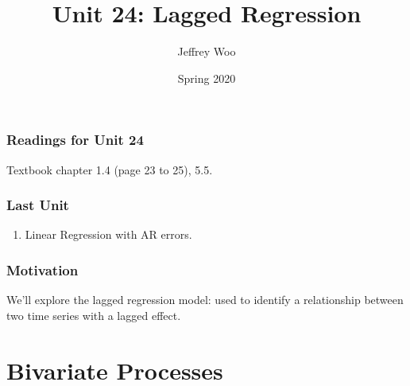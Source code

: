 \documentclass[%
xcolor=pdftex]{beamer}
\title{Unit 24: Lagged Regression}
\author[STAT 5170: Applied Time Series, Unit 26]{Jeffrey Woo}
\institute{Department of Statistics, University of Virginia}
\date{Spring 2020}
\begin{document}
\frame{\titlepage}


\begin{frame}
\frametitle{Readings for Unit 24}

Textbook chapter 1.4 (page 23 to 25), 5.5.

\end{frame}


\begin{frame}
\frametitle{Last Unit}
\begin{enumerate}
\item Linear Regression with AR errors.
\end{enumerate}
\end{frame}

\begin{frame}
\frametitle{Motivation}

We'll explore the lagged regression model: used to identify a relationship between two time series with a lagged effect.


\end{frame}

\section{Bivariate Processes}
\frame{\tableofcontents[currentsection]}








\end{document}
